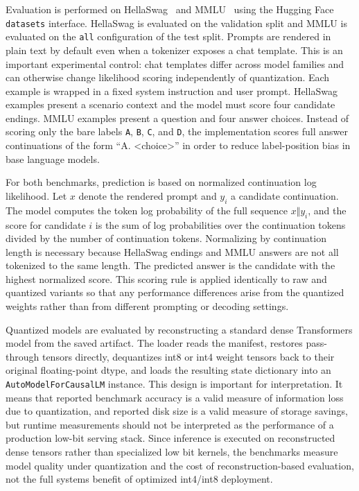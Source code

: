 \documentclass[11pt,twocolumn]{article}
\begin{document}
Evaluation is performed on HellaSwag~\cite{zellers2019hellaswag} and MMLU~\cite{hendrycks2021mmlu} using the Hugging Face \texttt{datasets} interface. HellaSwag is evaluated on the validation split and MMLU is evaluated on the \texttt{all} configuration of the test split. Prompts are rendered in plain text by default even when a tokenizer exposes a chat template. This is an important experimental control: chat templates differ across model families and can otherwise change likelihood scoring independently of quantization. Each example is wrapped in a fixed system instruction and user prompt. HellaSwag examples present a scenario context and the model must score four candidate endings. MMLU examples present a question and four answer choices. Instead of scoring only the bare labels \texttt{A}, \texttt{B}, \texttt{C}, and \texttt{D}, the implementation scores full answer continuations of the form ``A. <choice>'' in order to reduce label-position bias in base language models.

For both benchmarks, prediction is based on normalized continuation log likelihood. Let $x$ denote the rendered prompt and $y_i$ a candidate continuation. The model computes the token log probability of the full sequence $x \Vert y_i$, and the score for candidate $i$ is the sum of log probabilities over the continuation tokens divided by the number of continuation tokens. Normalizing by continuation length is necessary because HellaSwag endings and MMLU answers are not all tokenized to the same length. The predicted answer is the candidate with the highest normalized score. This scoring rule is applied identically to raw and quantized variants so that any performance differences arise from the quantized weights rather than from different prompting or decoding settings.

Quantized models are evaluated by reconstructing a standard dense Transformers model from the saved artifact. The loader reads the manifest, restores pass-through tensors directly, dequantizes int8 or int4 weight tensors back to their original floating-point dtype, and loads the resulting state dictionary into an \texttt{AutoModelForCausalLM} instance. This design is important for interpretation. It means that reported benchmark accuracy is a valid measure of information loss due to quantization, and reported disk size is a valid measure of storage savings, but runtime measurements should not be interpreted as the performance of a production low-bit serving stack. Since inference is executed on reconstructed dense tensors rather than specialized low bit kernels, the benchmarks measure model quality under quantization and the cost of reconstruction-based evaluation, not the full systems benefit of optimized int4/int8 deployment.
\end{document}
